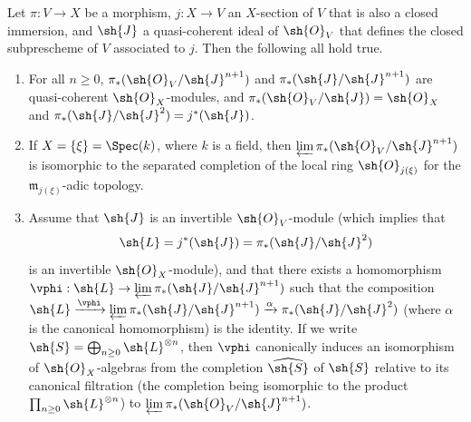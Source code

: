 \begin{lemma}[8.10.1]
\label{II.8.10.1}
Let $\pi:V\to X$ be a morphism, $j:X\to V$ an $X$-section of $V$ that is also a closed immersion, and $\sh{J}$ a quasi-coherent ideal of $\sh{O}_V$ that defines the closed subprescheme of $V$ associated to $j$.
Then the following all hold true.
\begin{enumerate}
  \item[\rm{(i)}] For all $n\geq0$, $\pi_*(\sh{O}_V/\sh{J}^{n+1})$ and $\pi_*(\sh{J}/\sh{J}^{n+1})$ are quasi-coherent $\sh{O}_X$-modules, and $\pi_*(\sh{O}_V/\sh{J})=\sh{O}_X$ and $\pi_*(\sh{J}/\sh{J}^2)=j^*(\sh{J})$.
  \item[\rm{(ii)}] If $X=\{\xi\}=\Spec(k)$, where $k$ is a field, then $\varprojlim\pi_*(\sh{O}_V/\sh{J}^{n+1})$ is isomorphic to the separated completion of the local ring $\sh{O}_{j(\xi)}$ for the $\mathfrak{m}_{j(\xi)}$-adic topology.
  \item[\rm{(iii)}] Assume that $\sh{J}$ is an invertible $\sh{O}_V$-module (which implies that
    \[
      \sh{L} = j^*(\sh{J}) = \pi_*(\sh{J}/\sh{J}^2)
    \]
    is an invertible $\sh{O}_X$-module), and that there exists a homomorphism $\vphi:\sh{L}\to\varprojlim\pi_*(\sh{J}/\sh{J}^{n+1})$ such that the composition $\sh{L} \xrightarrow{\vphi} \varprojlim\pi_*(\sh{J}/\sh{J}^{n+1}) \xrightarrow{\alpha} \pi_*(\sh{J}/\sh{J}^2)$ (where $\alpha$ is the canonical homomorphism) is the identity.
    If we write $\sh{S}=\bigoplus_{n\geq0}\sh{L}^{\otimes n}$, then $\vphi$ canonically induces an isomorphism of $\sh{O}_X$-algebras from the completion $\widehat{\sh{S}}$ of $\sh{S}$ relative to its canonical filtration (the completion being isomorphic to the product $\prod_{n\geq0}\sh{L}^{\otimes n}$) to $\varprojlim\pi_*(\sh{O}_V/\sh{J}^{n+1})$.
\end{enumerate}
\end{lemma}

